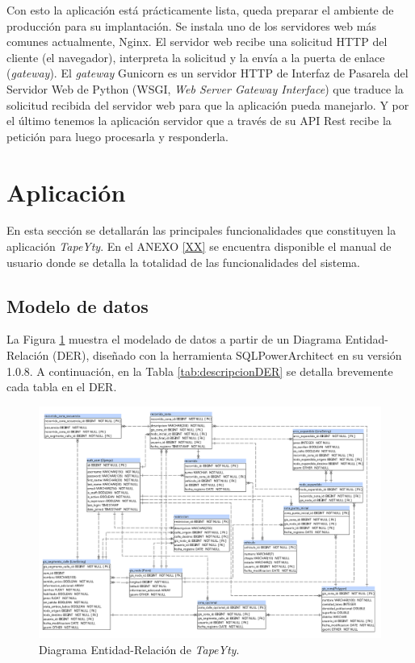 Con esto la aplicación está prácticamente lista, queda preparar el ambiente de producción para su implantación. Se instala uno de los servidores web más comunes actualmente, Nginx. El servidor web recibe una solicitud HTTP del cliente (el navegador), interpreta la solicitud y la envía a la puerta de enlace (\textit{gateway}). El \textit{gateway} Gunicorn es un servidor HTTP de Interfaz de Pasarela del Servidor Web de Python (WSGI, \textit{Web Server Gateway Interface}) que traduce la solicitud recibida del servidor web para que la aplicación pueda manejarlo. Y por el último tenemos la aplicación servidor que a través de su API Rest recibe la petición para luego procesarla y responderla.

\section{Aplicación}

En esta sección se detallarán las principales funcionalidades que constituyen la aplicación \textit{TapeYty}. En el ANEXO \ref{XX} se encuentra disponible el manual de usuario donde se detalla la totalidad de las funcionalidades del sistema.

\subsection{Modelo de datos}

La Figura \ref{fig:DERTapeYty} muestra el modelado de datos a partir de un Diagrama Entidad-Relación (DER), diseñado con la herramienta SQLPowerArchitect \citep{SQLArchitect} en su versión 1.0.8. A continuación, en la Tabla \ref{tab:descripcionDER} se detalla brevemente cada tabla en el DER.

\begin{landscape}
\begin{figure}[tbp]
\centerline{\includegraphics[height=\textheight]{20190716_DER.png}}
\caption{Diagrama Entidad-Relación de \textit{TapeYty}.}
\label{fig:DERTapeYty}
\end{figure}
\end{landscape}

